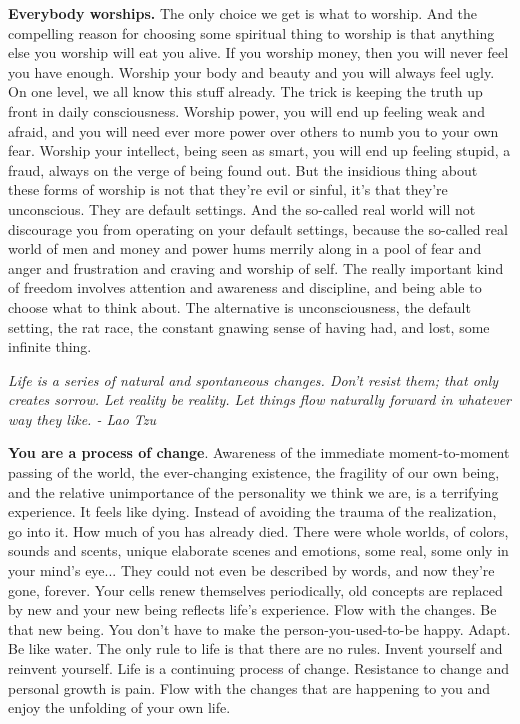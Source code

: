 \documentclass[a4paper,hidelinks]{article}
\begin{document}
\textbf{Everybody worships.} The only choice we get is what to worship.
And the compelling reason for choosing some spiritual thing to worship is that anything else you worship will eat you alive.
If you worship money, then you will never feel you have enough.
Worship your body and beauty and you will always feel ugly.
On one level, we all know this stuff already.
The trick is keeping the truth up front in daily consciousness.
Worship power, you will end up feeling weak and afraid, and you will need ever more power over others to numb you to your own fear.
Worship your intellect, being seen as smart, you will end up feeling stupid, a fraud, always on the verge of being found out.
But the insidious thing about these forms of worship is not that they’re evil or sinful, it’s that they’re unconscious.
They are default settings.
And the so-called real world will not discourage you from operating on your default settings, because the so-called real world of men and money and power hums merrily along in a pool of fear and anger and frustration and craving and worship of self.
The really important kind of freedom involves attention and awareness and discipline, and being able to choose what to think about.
The alternative is unconsciousness, the default setting, the rat race, the constant gnawing sense of having had, and lost, some infinite thing.

\newpage

\begin{center}
\textit{
Life is a series of natural and spontaneous changes. Don't resist them; that only creates sorrow. Let reality be reality. Let things flow naturally forward in whatever way they like. - Lao Tzu
}
\end{center}

\textbf{You are a process of change}.
Awareness of the immediate moment-to-moment passing of the world, the ever-changing existence, the fragility of our own being, and the relative unimportance of the personality we think we are, is a terrifying experience.
It feels like dying.
Instead of avoiding the trauma of the realization, go into it.
How much of you has already died.
There were whole worlds, of colors, sounds and scents, unique elaborate scenes and emotions, some real, some only in your mind’s eye...
They could not even be described by words, and now they're gone, forever.
Your cells renew themselves periodically, old concepts are replaced by new and your new being reflects life’s experience.
Flow with the changes.
Be that new being.
You don’t have to make the person-you-used-to-be happy.
Adapt.
Be like water.
The only rule to life is that there are no rules.
Invent yourself and reinvent yourself.
Life is a continuing process of change.
Resistance to change and personal growth is pain.
Flow with the changes that are happening to you and enjoy the unfolding of your own life.
\end{document}
